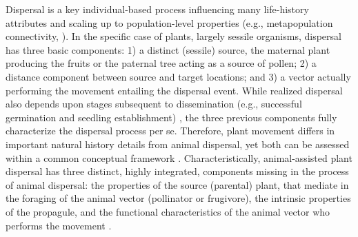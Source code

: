 \documentclass[a4paper, 12pt]{article}
\begin{document}
\begin{linenumbers}
Dispersal is a key individual-based process influencing many life-history attributes and scaling up to population-level properties (e.g., metapopulation connectivity, \citealt{Cousens:2008aa}). In the specific case of plants, largely sessile organisms, dispersal has three basic components: 1) a distinct (sessile) source, the maternal plant producing the fruits or the paternal tree acting as a source of pollen; 2) a distance component between source and target locations; and 3) a vector actually performing the movement entailing the dispersal event. While realized dispersal also depends upon stages subsequent to dissemination (e.g., successful germination and seedling establishment) \cite{Schupp:1995}, the three previous components fully characterize the dispersal process per se. Therefore, plant movement differs in important natural history details from animal dispersal, yet both can be assessed within a common conceptual framework \citep[e.g., ][]{Nathan:2006aa}. Characteristically, animal-assisted plant dispersal has three distinct, highly integrated, components missing in the process of animal dispersal: the properties of the source (parental) plant, that mediate in the foraging of the animal vector (pollinator or frugivore), the intrinsic properties of the propagule, and the functional characteristics of the animal vector who performs the movement \citep{Nathan:2008fx}.    


\end{linenumbers}
\end{document}
